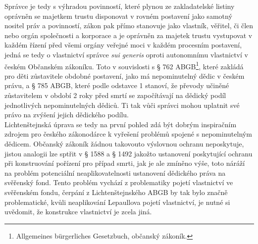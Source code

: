 \documentclass{article}
\begin{document}
Správce je tedy s výhradou povinností, které plynou ze zakladatelské listiny oprávněn se majetkem trustu disponovat v rovném postavení jako samotný nositel práv a povinností, zákon pak přímo stanovuje jako vlastník, věřitel, či člen nebo orgán společnosti a korporace a je oprávněn za majetek trustu vystupovat v každém řízení před všemi orgány veřejné moci v každém procesním postavení, jedná se tedy o vlastnictví správce \textit{sui generis} oproti autonomnímu vlastnictví v českém Občanském zákoníku. Toto v souvislosti s § 762 ABGB\footnote{Allgemeines bürgerliches Gesetzbuch, občanský zákoník.}, které zakládá pro děti zůstavitele obdobné postavení, jako má nepominutelný dědic v českém právu, a § 785 ABGB, které podle odstavce 1 stanoví, že převody učiněné zůstavitelem v období 2 roky před smrtí se započítávají na dědický podíl jednotlivých nepominutelných dědiců. Ti tak vůči správci mohou uplatnit své právo na zvýšení jejich dědického podílu.\\

Lichtenštejnská úprava se tedy na první pohled zdá být dobrým inspiračním zdrojem pro českého zákonodárce k vyřešení problémů spojené s nepominutelným dědicem. Občanský zákoník žádnou takovouto výslovnou ochranu neposkytuje, jistou analogii lze sptřit v § 1588 a § 1492 jakožto ustanovení poskytující ochranu při konstruování pořízení pro případ smrti, jak je ale zmíněno výše, toto náráží na problém potenciální neaplikovatelnosti ustanovení dědického práva na svěřenský fond. Tento problém vychází z problematiky pojetí vlastnictví ve svěřenském fondu, čerpání z Lichtenštejnského ABGB by tak bylo značně problematické, kvůli neaplikování Lepaullova pojetí vlastnictví, je nutné si uvědomit, že konstrukce vlastnictví je zcela jiná.\\
\end{document}
